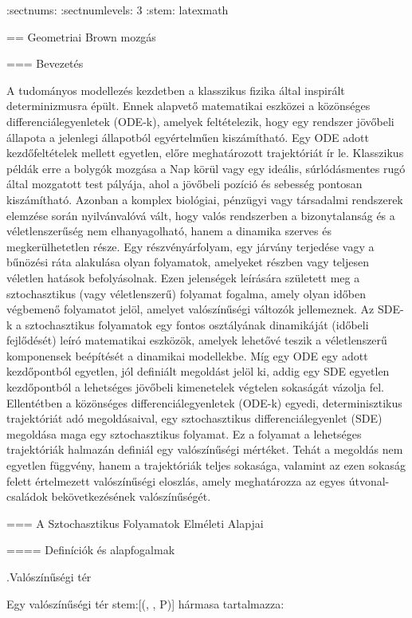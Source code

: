 \documentclass[11pt]{article}
\begin{document}
:sectnums:
:sectnumlevels: 3
:stem: latexmath

== Geometriai Brown mozgás

=== Bevezetés

A tudományos modellezés kezdetben a klasszikus fizika által inspirált determinizmusra épült.
Ennek alapvető matematikai eszközei a közönséges differenciálegyenletek (ODE-k), amelyek feltételezik, hogy egy rendszer jövőbeli állapota a jelenlegi állapotból egyértelműen kiszámítható. Egy ODE adott kezdőfeltételek mellett egyetlen, előre meghatározott trajektóriát ír le.
Klasszikus példák erre a bolygók mozgása a Nap körül vagy egy ideális, súrlódásmentes rugó által mozgatott test pályája, ahol a jövőbeli pozíció és sebesség pontosan kiszámítható.
Azonban a komplex biológiai, pénzügyi vagy társadalmi rendszerek elemzése során nyilvánvalóvá vált, hogy valós rendszerben a bizonytalanság és a véletlenszerűség nem elhanyagolható, hanem a dinamika szerves és megkerülhetetlen része.
Egy részvényárfolyam, egy járvány terjedése vagy a bűnözési ráta alakulása olyan folyamatok, amelyeket részben vagy teljesen véletlen hatások befolyásolnak.
Ezen jelenségek leírására született meg a sztochasztikus (vagy véletlenszerű) folyamat fogalma, amely olyan időben végbemenő folyamatot jelöl, amelyet valószínűségi változók jellemeznek.
Az SDE-k a sztochasztikus folyamatok egy fontos osztályának dinamikáját (időbeli fejlődését) leíró matematikai eszközök, amelyek lehetővé teszik a véletlenszerű komponensek beépítését a dinamikai modellekbe.
Míg egy ODE egy adott kezdőpontból egyetlen, jól definiált megoldást jelöl ki, addig egy SDE egyetlen kezdőpontból a lehetséges jövőbeli kimenetelek végtelen sokaságát vázolja fel.
Ellentétben a közönséges differenciálegyenletek (ODE-k) egyedi, determinisztikus trajektóriát adó megoldásaival, egy sztochasztikus differenciálegyenlet (SDE) megoldása maga egy sztochasztikus folyamat.
Ez a folyamat a lehetséges trajektóriák halmazán definiál egy valószínűségi mértéket.
Tehát a megoldás nem egyetlen függvény, hanem a trajektóriák teljes sokasága, valamint az ezen sokaság felett értelmezett valószínűségi eloszlás, amely meghatározza az egyes útvonal-családok bekövetkezésének valószínűségét.

=== A Sztochasztikus Folyamatok Elméleti Alapjai

==== Definíciók és alapfogalmak

.Valószínűségi tér

Egy valószínűségi tér stem:[(\Omega, , P)] hármasa tartalmazza:
\end{document}

